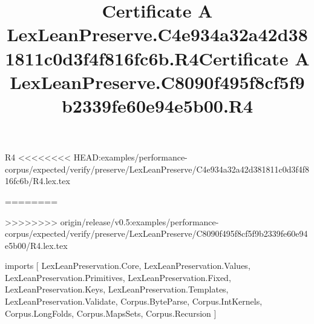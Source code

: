 \begin{lexlean}{R4}
<<<<<<<< HEAD:examples/performance-corpus/expected/verify/preserve/LexLeanPreserve/C4e934a32a42d381811c0d3f4f816fc6b/R4.lex.tex
\title{Certificate A LexLeanPreserve.C4e934a32a42d381811c0d3f4f816fc6b.R4}
========
\title{Certificate A LexLeanPreserve.C8090f495f8cf5f9b2339fe60e94e5b00.R4}
>>>>>>>> origin/release/v0.5:examples/performance-corpus/expected/verify/preserve/LexLeanPreserve/C8090f495f8cf5f9b2339fe60e94e5b00/R4.lex.tex
\begin{coremodule}
imports [
  LexLeanPreservation.Core,
  LexLeanPreservation.Values,
  LexLeanPreservation.Primitives,
  LexLeanPreservation.Fixed,
  LexLeanPreservation.Keys,
  LexLeanPreservation.Templates,
  LexLeanPreservation.Validate,
  Corpus.ByteParse,
  Corpus.IntKernels,
  Corpus.LongFolds,
  Corpus.MapsSets,
  Corpus.Recursion
]


\end{coremodule}
\end{lexlean}
